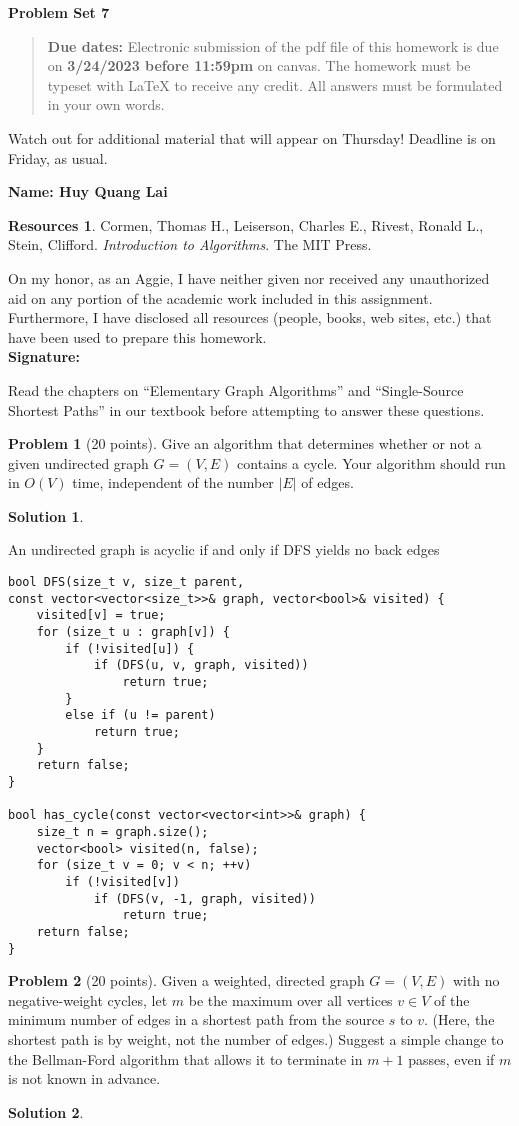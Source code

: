 \documentclass{article}
\theoremstyle{definition}
\newtheorem{problem}{Problem}
\newtheorem*{solution}{Solution}
\newtheorem*{resources}{Resources}
\newcommand{\name}[1]{\noindent\textbf{Name: #1}}
\newcommand{\honor}{\noindent On my honor, as an Aggie, I have neither
  given nor received any unauthorized aid on any portion of the
  academic work included in this assignment. Furthermore, I have
  disclosed all resources (people, books, web sites, etc.) that have
  been used to prepare this homework. \\[1ex]
 \textbf{Signature:} \underline{\hspace*{5cm}} }
\newcommand{\problemset}[1]{\begin{center}\textbf{Problem Set
      #1}\end{center}}
\newcommand{\duedate}[2]{\begin{quote}\textbf{Due dates:} Electronic
    submission of the pdf file of this homework is due on
    \textbf{#1} on canvas. The homework must be typeset with LaTeX to
    receive any credit. All answers must be formulated in your own words.\end{quote} }
\begin{document}
\problemset{7}
\duedate{3/24/2023 before 11:59pm}

\textbf{Watch out for additional material that will appear on
  Thursday! Deadline is on Friday, as usual.} 

\name{ Huy Quang Lai}
\begin{resources} Cormen, Thomas H., Leiserson, Charles E., Rivest, Ronald L., Stein, Clifford. \textit{Introduction to Algorithms}. The MIT Press.
\end{resources}
\honor

\newpage

Read the chapters on ``Elementary Graph Algorithms'' and
``Single-Source Shortest Paths'' in our textbook before
attempting to answer these questions.

\begin{problem}[20 points]
Give an algorithm that determines whether or not a given undirected
graph $G=(V,E)$ contains a cycle. Your algorithm should run in $O(V)$
time, independent of the number $|E|$ of edges. 
\end{problem}
\begin{solution}
\end{solution}

\noindent
An undirected graph is acyclic if and only if DFS yields no back edges 

\begin{verbatim}
bool DFS(size_t v, size_t parent, 
const vector<vector<size_t>>& graph, vector<bool>& visited) {
    visited[v] = true;
    for (size_t u : graph[v]) {
        if (!visited[u]) {
            if (DFS(u, v, graph, visited))
                return true;
        }
        else if (u != parent)
            return true;
    }
    return false;
}

bool has_cycle(const vector<vector<int>>& graph) {
    size_t n = graph.size();
    vector<bool> visited(n, false);
    for (size_t v = 0; v < n; ++v)
        if (!visited[v])
            if (DFS(v, -1, graph, visited))
                return true;
    return false;
}
\end{verbatim}

\begin{problem}[20 points]
Given a weighted, directed graph $G=(V,E)$ with no negative-weight
cycles, let $m$ be the maximum over all vertices $v\in V$ of the minimum
number of edges in a shortest path from the source $s$ to $v$. (Here, the
shortest path is by weight, not the number of edges.) Suggest a simple
change to the Bellman-Ford algorithm that allows it to terminate in $m+1$
passes, even if $m$ is not known in advance.
\end{problem}
\begin{solution}
\end{solution}
\end{document}
